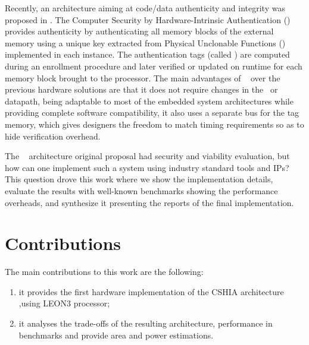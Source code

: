 Recently, an architecture aiming at code/data authenticity and integrity was proposed in \cite{Hoffman2015}. The Computer Security by Hardware-Intrinsic Authentication (\cshia) provides authenticity by authenticating all memory blocks of the external memory using a unique key extracted from Physical Unclonable Functions (\pufs) implemented in each instance. The authentication tags (called \ptags) are computed during an enrollment procedure and later verified or updated on runtime for each memory block brought to the processor. The main advantages of \cshia~ over the previous hardware solutions are that it does not require changes in the \isa~or datapath, being adaptable to most of the embedded system architectures while providing complete software compatibility, it also uses a separate bus for the tag memory, which gives designers the freedom to match timing requirements so as to hide verification overhead. 


The \cshia~ architecture original proposal had security and viability evaluation, but how can one implement such a system using industry standard tools and IPs?  This question drove this work where we show the implementation details, evaluate the results with well-known benchmarks showing the performance overheads, and synthesize it presenting the reports of the final implementation. 







\section{Contributions}
\label{sec:contributions}
The main contributions to this work are the following: 
\begin{enumerate}[label=(\alph*)]
    \item it provides the first hardware implementation of the CSHIA architecture ,using LEON3 processor;
    \item it analyses the trade-offs of the resulting architecture, performance in benchmarks and provide area and power estimations. 
\end{enumerate}

